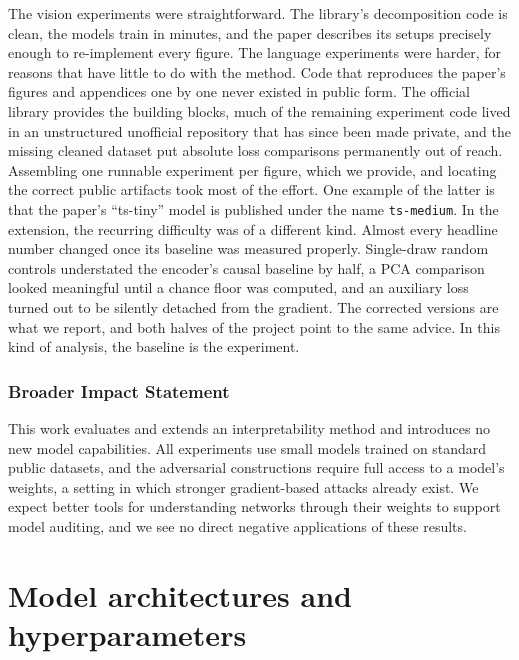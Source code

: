 \documentclass[10pt]{article} %
\begin{document}
The vision experiments were straightforward. The library's decomposition code is
clean, the models train in minutes, and the paper describes its setups precisely
enough to re-implement every figure. The language experiments were harder, for
reasons that have little to do with the method. Code that reproduces the paper's
figures and appendices one by one never existed in public form. The official
library provides the building blocks, much of the remaining experiment code lived
in an unstructured unofficial repository that has since been made private, and the
missing cleaned dataset put absolute loss comparisons permanently out of reach.
Assembling one runnable experiment per figure, which we provide, and locating the
correct public artifacts took most of the effort. One example of the latter is
that the paper's ``ts-tiny'' model is published under the name \texttt{ts-medium}.
In the extension, the recurring difficulty was of a different kind. Almost every
headline number changed once its baseline was measured properly. Single-draw
random controls understated the encoder's causal baseline by half, a PCA
comparison looked meaningful until a chance floor was computed, and an auxiliary
loss turned out to be silently detached from the gradient. The corrected versions
are what we report, and both halves of the project point to the same advice. In
this kind of analysis, the baseline is the experiment.

\subsubsection*{Broader Impact Statement}

This work evaluates and extends an interpretability method and introduces no new
model capabilities. All experiments use small models trained on standard public
datasets, and the adversarial constructions require full access to a model's
weights, a setting in which stronger gradient-based attacks already exist. We
expect better tools for understanding networks through their weights to support
model auditing, and we see no direct negative applications of these results.




\appendix

\section{Model architectures and hyperparameters}
\label{app:hyper}
\end{document}
